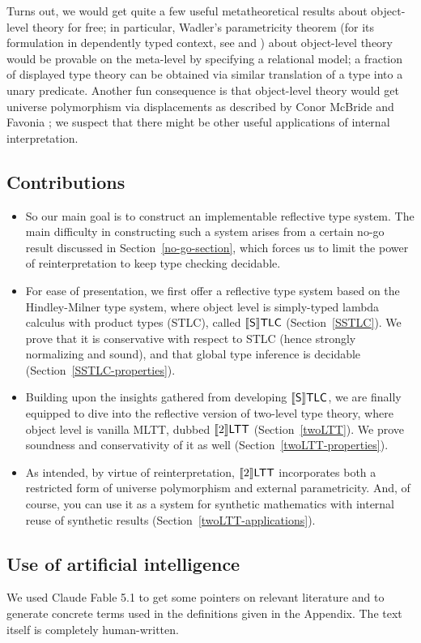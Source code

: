 Turns out, we would get quite a few useful
metatheoretical results about object-level theory for
free; in particular, Wadler's parametricity theorem
\cite{wadler1989theorems,reynolds1983types} (for its
formulation in dependently typed context, see
\cite{Bernardy:Parametricity2010} and
\cite{Altenkirch:Parametricity2024}) about object-level
theory would be provable on the meta-level by
specifying a relational model; a fraction of displayed
type theory \cite{Kolomatskaia_Shulman_2025} can be
obtained via similar translation of a type into a unary
predicate. Another fun consequence is that object-level
theory would get universe polymorphism via displacements
as described by Conor McBride \cite{McBride:Crude2011,
McBride:Crude2012} and Favonia
\cite{Favonia:Displacement2023}; we suspect that there
might be other useful applications of internal
interpretation.

\subsection{Contributions}

\begin{itemize}
    \item So our main goal is to construct an
        implementable reflective type system. The main
        difficulty in constructing such a system arises
        from a certain no-go result discussed in
        Section~\ref{no-go-section}, which forces us to
        limit the power of reinterpretation to
        keep type checking decidable.
    \item For ease of presentation, we first offer a
        reflective type system based on the
        Hindley-Milner type system, where object level
        is simply-typed lambda calculus with product
        types (STLC), called $\llbracket\mathsf{S}\rrbracket\mathsf{TLC}$
        (Section~\ref{SSTLC}). We prove that it is
        conservative with respect to STLC (hence
        strongly normalizing and sound), and that global
        type inference is decidable
        (Section~\ref{SSTLC-properties}).
    \item Building upon the insights gathered from
        developing $\llbracket\mathsf{S}\rrbracket\mathsf{TLC}$, we are finally equipped to
        dive into the reflective version of two-level
        type theory, where object level is vanilla MLTT,
        dubbed $\llbracket 2\rrbracket\mathsf{LTT}$ (Section~\ref{twoLTT}). We
        prove soundness and conservativity of it as well
        (Section~\ref{twoLTT-properties}).
    \item As intended, by virtue of reinterpretation,
        $\llbracket 2\rrbracket\mathsf{LTT}$ incorporates both a restricted form of
        universe polymorphism and external
        parametricity. And, of course, you can use it as
        a system for synthetic mathematics with internal
        reuse of synthetic results
        (Section~\ref{twoLTT-applications}).
\end{itemize}

\subsection{Use of artificial intelligence}

We used Claude Fable 5.1 \cite{claude_fable} to get some
pointers on relevant literature and to generate concrete
terms used in the definitions given in the Appendix. The
text itself is completely human-written.
